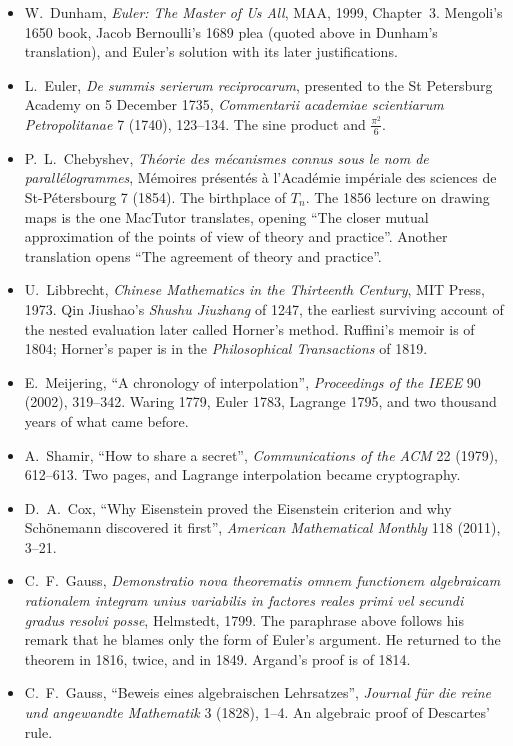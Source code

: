 \begin{itemize}\raggedright
\item W.~Dunham, \emph{Euler: The Master of Us All}, MAA, 1999, Chapter~3. Mengoli's 1650 book, Jacob Bernoulli's 1689 plea (quoted above in Dunham's translation), and Euler's solution with its later justifications.
\item L.~Euler, \emph{De summis serierum reciprocarum}, presented to the St Petersburg Academy on 5 December 1735, \emph{Commentarii academiae scientiarum Petropolitanae} 7 (1740), 123--134. The sine product and $\frac{\pi^2}6$.
\item P.~L.~Chebyshev, \emph{Th\'eorie des m\'ecanismes connus sous le nom de parall\'elogrammes}, M\'emoires pr\'esent\'es \`a l'Acad\'emie imp\'eriale des sciences de St-P\'etersbourg 7 (1854). The birthplace of $T_n$. The 1856 lecture on drawing maps is the one MacTutor translates, opening ``The closer mutual approximation of the points of view of theory and practice''. Another translation opens ``The agreement of theory and practice''.
\item U.~Libbrecht, \emph{Chinese Mathematics in the Thirteenth Century}, MIT Press, 1973. Qin Jiushao's \emph{Shushu Jiuzhang} of 1247, the earliest surviving account of the nested evaluation later called Horner's method. Ruffini's memoir is of 1804; Horner's paper is in the \emph{Philosophical Transactions} of 1819.
\item E.~Meijering, ``A chronology of interpolation'', \emph{Proceedings of the IEEE} 90 (2002), 319--342. Waring 1779, Euler 1783, Lagrange 1795, and two thousand years of what came before.
\item A.~Shamir, ``How to share a secret'', \emph{Communications of the ACM} 22 (1979), 612--613. Two pages, and Lagrange interpolation became cryptography.
\item D.~A.~Cox, ``Why Eisenstein proved the Eisenstein criterion and why Sch\"onemann discovered it first'', \emph{American Mathematical Monthly} 118 (2011), 3--21.
\item C.~F.~Gauss, \emph{Demonstratio nova theorematis omnem functionem algebraicam rationalem integram unius variabilis in factores reales primi vel secundi gradus resolvi posse}, Helmstedt, 1799. The paraphrase above follows his remark that he blames only the form of Euler's argument. He returned to the theorem in 1816, twice, and in 1849. Argand's proof is of 1814.
\item C.~F.~Gauss, ``Beweis eines algebraischen Lehrsatzes'', \emph{Journal f\"ur die reine und angewandte Mathematik} 3 (1828), 1--4. An algebraic proof of Descartes' rule.

\end{itemize}
